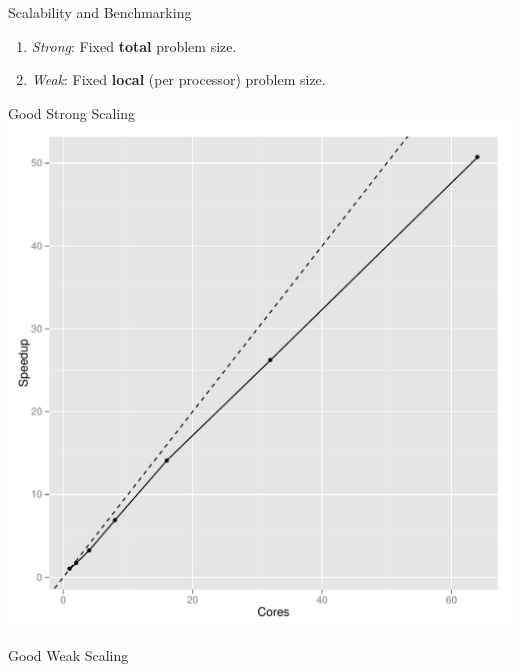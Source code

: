 \begin{frame}
  \begin{block}{Scalability and Benchmarking}
  \begin{enumerate}[<+-|alert@+>]
    \item \emph{Strong}:  Fixed \textbf{total} problem size.
    \item \emph{Weak}:  Fixed \textbf{local} (per processor) problem size.
  \end{enumerate}  
  \end{block}
\end{frame}


\begin{frame}
   \begin{center}
    \begin{minipage}{.475\textwidth}
    \begin{block}{Good Strong Scaling}
      \centering
      \includegraphics[width=.95\textwidth]{../common/pics/scaling_strong}
    \end{block}
    \end{minipage}
    \hspace{.1cm}
    \begin{minipage}{.475\textwidth}
    \begin{block}{Good Weak Scaling}
      \centering

\end{block}
\end{minipage}
\end{center}
\end{frame}
